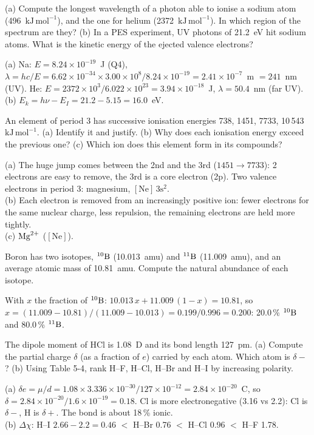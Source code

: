 (a) Compute the longest wavelength of a photon able to ionise a sodium atom (496~$\mathrm{kJ\,mol^{-1}}$),
and the one for helium (2372~$\mathrm{kJ\,mol^{-1}}$). In which region of the spectrum are they?
(b) In a PES experiment, UV photons of 21.2~eV hit sodium atoms. What is the kinetic energy of the
ejected valence electrons?
\begin{solution}
(a) Na: $E = 8.24\times10^{-19}$~J (Q4), $\lambda = hc/E = 6.62\times10^{-34}\times3.00\times10^8/8.24\times10^{-19}
= 2.41\times10^{-7}$~m $= 241$~nm (UV).
He: $E = 2372\times10^3/6.022\times10^{23} = 3.94\times10^{-18}$~J, $\lambda = 50.4$~nm (far UV).\\
(b) $E_k = h\nu - E_I = 21.2 - 5.15 = 16.0$~eV.
\end{solution}

An element of period 3 has successive ionisation energies 738, 1451, 7733, 10\,543~$\mathrm{kJ\,mol^{-1}}$.
(a) Identify it and justify. (b) Why does each ionisation energy exceed the previous one? (c) Which ion
does this element form in its compounds?
\begin{solution}
(a) The huge jump comes between the 2nd and the 3rd ($1451\to7733$): 2 electrons are easy to remove,
the 3rd is a core electron (2p). Two valence electrons in period 3: magnesium, $[\mathrm{Ne}]\,3\mathrm s^2$.\\
(b) Each electron is removed from an increasingly positive ion: fewer electrons for the same nuclear
charge, less repulsion, the remaining electrons are held more tightly.\\
(c) $\ce{Mg^2+}$ ($[\mathrm{Ne}]$).
\end{solution}

Boron has two isotopes, ${}^{10}\mathrm{B}$ (10.013~amu) and ${}^{11}\mathrm{B}$ (11.009~amu), and an average atomic
mass of 10.81~amu. Compute the natural abundance of each isotope.
\begin{solution}
With $x$ the fraction of ${}^{10}\mathrm{B}$: $10.013\,x + 11.009\,(1-x) = 10.81$, so
$x = (11.009 - 10.81)/(11.009 - 10.013) = 0.199/0.996 = 0.200$: 20.0\,\% ${}^{10}\mathrm{B}$ and
80.0\,\% ${}^{11}\mathrm{B}$.
\end{solution}

The dipole moment of HCl is 1.08~D and its bond length 127~pm. (a) Compute the partial charge $\delta$
(as a fraction of $e$) carried by each atom. Which atom is $\delta-$? (b) Using Table 5-4, rank
H--F, H--Cl, H--Br and H--I by increasing polarity.
\begin{solution}
(a) $\delta e = \mu/d = 1.08\times3.336\times10^{-30}/127\times10^{-12} = 2.84\times10^{-20}$~C, so
$\delta = 2.84\times10^{-20}/1.6\times10^{-19} = 0.18$. Cl is more electronegative (3.16 vs 2.2): Cl is
$\delta-$, H is $\delta+$. The bond is about 18\,\% ionic.\\
(b) $\Delta\chi$: H--I $2.66 - 2.2 = 0.46$ $<$ H--Br 0.76 $<$ H--Cl 0.96 $<$ H--F 1.78.
\end{solution}

